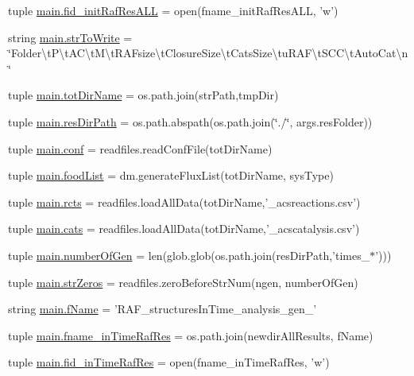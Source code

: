 \begin{DoxyCompactItemize}
\item 
tuple \hyperlink{a00153_a45aeb03f0d9cc30cb0a490354fd76d6c}{main.\+fid\+\_\+init\+Raf\+Res\+A\+L\+L} = open(fname\+\_\+init\+Raf\+Res\+A\+L\+L, 'w')
\item 
string \hyperlink{a00153_ab9980383a541b03ce91d6b812a4bf79a}{main.\+str\+To\+Write} = \char`\"{}Folder\textbackslash{}t\+P\textbackslash{}t\+A\+C\textbackslash{}t\+M\textbackslash{}t\+R\+A\+Fsize\textbackslash{}t\+Closure\+Size\textbackslash{}t\+Cats\+Size\textbackslash{}tu\+R\+A\+F\textbackslash{}t\+S\+C\+C\textbackslash{}t\+Auto\+Cat\textbackslash{}n\char`\"{}
\item 
tuple \hyperlink{a00153_a82f73a786e4c93e909fd689ee0d0812e}{main.\+tot\+Dir\+Name} = os.\+path.\+join(str\+Path,tmp\+Dir)
\item 
tuple \hyperlink{a00153_a93d7d68ada532b3cedaab103283ab91a}{main.\+res\+Dir\+Path} = os.\+path.\+abspath(os.\+path.\+join(\char`\"{}./\char`\"{}, args.\+res\+Folder))
\item 
tuple \hyperlink{a00153_adc567db25548116293968a9102beab98}{main.\+conf} = readfiles.\+read\+Conf\+File(tot\+Dir\+Name)
\item 
tuple \hyperlink{a00153_a07ce1f0750b6dc5baff89792fc194152}{main.\+food\+List} = dm.\+generate\+Flux\+List(tot\+Dir\+Name, sys\+Type)
\item 
tuple \hyperlink{a00153_ac2fe1ed3228b8e616f25ccfbe4cc7dc4}{main.\+rcts} = readfiles.\+load\+All\+Data(tot\+Dir\+Name,'\+\_\+acsreactions.\+csv')
\item 
tuple \hyperlink{a00153_adc0282a6415a88834556e66807bcc800}{main.\+cats} = readfiles.\+load\+All\+Data(tot\+Dir\+Name,'\+\_\+acscatalysis.\+csv')
\item 
tuple \hyperlink{a00153_aabf82b9e9c2293000a67162becdd440d}{main.\+number\+Of\+Gen} = len(glob.\+glob(os.\+path.\+join(res\+Dir\+Path,'times\+\_\+$\ast$')))
\item 
tuple \hyperlink{a00153_a02d59015bebcf0ad1bc1162efca757c3}{main.\+str\+Zeros} = readfiles.\+zero\+Before\+Str\+Num(ngen, number\+Of\+Gen)
\item 
string \hyperlink{a00153_a9fff4b23f9489649601960dabc4a6cdd}{main.\+f\+Name} = 'R\+A\+F\+\_\+structures\+In\+Time\+\_\+analysis\+\_\+gen\+\_\+'
\item 
tuple \hyperlink{a00153_a64d742d069748ddd43a9378ef918d0b1}{main.\+fname\+\_\+in\+Time\+Raf\+Res} = os.\+path.\+join(newdir\+All\+Results, f\+Name)
\item 
tuple \hyperlink{a00153_ab82095abcedb97b7abf8e003f4724d0c}{main.\+fid\+\_\+in\+Time\+Raf\+Res} = open(fname\+\_\+in\+Time\+Raf\+Res, 'w')

\end{DoxyCompactItemize}
